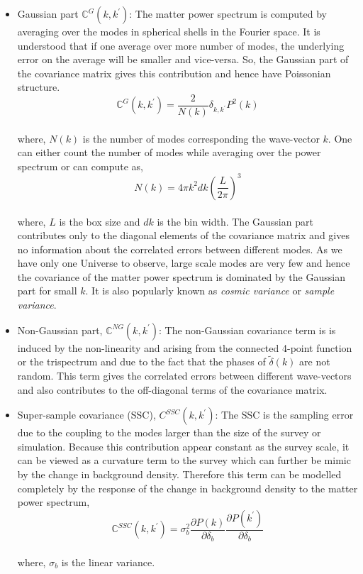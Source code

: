 \begin{itemize}
	\item Gaussian part $\mathbb{C}^{G}(k,k^{\prime})$: The matter power spectrum is computed
			by averaging over the modes in spherical shells in the Fourier space. It 
			is understood that if one average over more number of modes, the underlying
			error on the average will be smaller and vice-versa. So, the Gaussian part
			of the covariance matrix gives this contribution and hence have Poissonian
			structure. 
			\begin{equation}
				\mathbb{C}^{G}(k,k^{\prime}) = \dfrac{2}{N(k)} \delta_{k,k^{\prime}} P^2(k)
			\end{equation}
			\\
			where, $N(k)$ is the number of modes corresponding the wave-vector $k$. One 
			can either count the number of modes while averaging over the power spectrum
			or can compute as,
			\begin{equation}
				N(k) = 4 \pi k^2 dk \left( \dfrac{L}{2\pi} \right)^3
			\end{equation}
			\\
			where, $L$ is the box size and $dk$ is the bin width. The Gaussian part 
			contributes only to the diagonal elements of the covariance matrix and gives no 
			information about the correlated errors between different modes. As we have
			only one Universe to observe, large scale modes are very few and hence
			the covariance of the matter power spectrum is dominated by the Gaussian
			part for small $k$. It is also popularly known as {\it cosmic variance}
			or {\it sample variance}.

	\item Non-Gaussian part, $\mathbb{C}^{NG}(k,k^{\prime})$: The non-Gaussian covariance term is 
			is induced by the non-linearity and arising from the connected 4-point function or the trispectrum and due to the fact that the phases of $\tilde{\delta}(k)$ are 
			not random. This term gives the correlated errors between
			different wave-vectors and also contributes to the off-diagonal terms
			of the covariance matrix. 

	\item Super-sample covariance (SSC), $C^{SSC}(k,k^{\prime})$: The SSC is the sampling
			error due to the coupling to the modes larger than the size of the survey or
			simulation. Because this contribution appear constant as the survey scale, it 
			can be viewed as a curvature term to the survey which can further be mimic
			by the change in background density. Therefore this term can be modelled
			completely by the response of the change in background density to the
			matter power spectrum,
			\begin{equation}
				\mathbb{C}^{SSC}(k,k^{\prime}) = \sigma_b^2 \dfrac{\partial P(k)}{\partial \delta_b}
										\dfrac{\partial P(k^{\prime})}{\partial \delta_b}
			\end{equation}
			\\
			where, $\sigma_b$ is the linear variance. 
\end{itemize}

